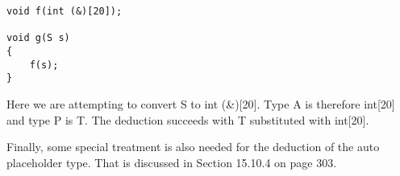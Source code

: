 \begin{lstlisting}[style=styleCXX]
void f(int (&)[20]);

void g(S s)
{
	f(s);
}
\end{lstlisting}

Here we are attempting to convert S to int (\&)[20]. Type A is therefore int[20] and type P is T. The deduction succeeds with T substituted with int[20].

Finally, some special treatment is also needed for the deduction of the auto placeholder type. That is discussed in Section 15.10.4 on page 303.


































